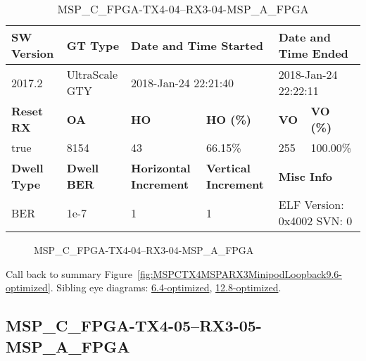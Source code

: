 \begin{table}[h]
\centering
\caption{MSP\_C\_FPGA-TX4-04--RX3-04-MSP\_A\_FPGA}
\label{tab:MSPCFPGATX404RX304MSPAFPGA9.6-optimized}
\begin{tabular}{@{}|l|l|l|l|l|l|@{}}
\toprule
\textbf{SW Version}                & \textbf{GT Type}   & \multicolumn{2}{l|}{\textbf{Date and Time Started}}            & \multicolumn{2}{l|}{\textbf{Date and Time Ended}}        \\ \midrule
2017.2                       & UltraScale GTY          & \multicolumn{2}{l|}{2018-Jan-24 22:21:40}                   & \multicolumn{2}{l|}{2018-Jan-24 22:22:11}               \\ \midrule
\textbf{Reset RX}                  & \textbf{OA} & \textbf{HO}   & \textbf{HO (\%)} & \textbf{VO} & \textbf{VO (\%)} \\ \midrule
true & 8154        & 43          & 66.15\%        & 255        & 100.00\%       \\ \midrule
\textbf{Dwell Type}                & \textbf{Dwell BER} & \textbf{Horizontal Increment} & \textbf{Vertical Increment}    & \multicolumn{2}{l|}{\textbf{Misc Info}}                  \\ \midrule
BER                            & 1e-7        & 1        & 1           & \multicolumn{2}{l|}{ELF Version: 0x4002 SVN: 0}                         \\ \bottomrule
\end{tabular}
\end{table}

\begin{figure}[h]
\caption{MSP\_C\_FPGA-TX4-04--RX3-04-MSP\_A\_FPGA} \label{fig:MSPCFPGATX404RX304MSPAFPGA9.6-optimized}
\end{figure}

Call back to summary Figure~\ref{fig:MSPCTX4MSPARX3MinipodLoopback9.6-optimized}.
Sibling eye diagrams: \hyperref[sec:MSPCFPGATX404RX304MSPAFPGA6.4-optimized]{6.4-optimized}, \hyperref[sec:MSPCFPGATX404RX304MSPAFPGA12.8-optimized]{12.8-optimized}.

\clearpage
\newpage


\subsection{MSP\_C\_FPGA-TX4-05--RX3-05-MSP\_A\_FPGA}\label{sec:MSPCFPGATX405RX305MSPAFPGA9.6-optimized}

